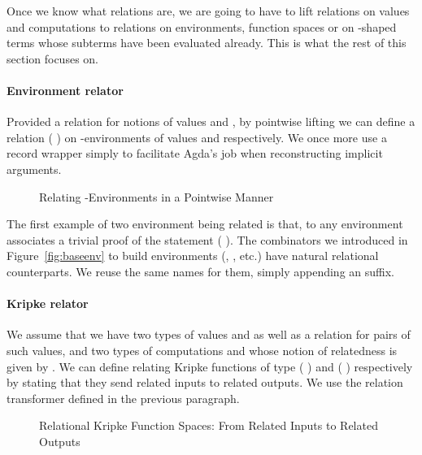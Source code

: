 Once we know what relations are, we are going to have to lift relations on values
and computations to relations on environments,  function spaces or
on -shaped terms whose subterms have been evaluated already.
This is what the rest of this section focuses on.

\paragraph{Environment relator}
Provided a relation  for notions of values  and , by
pointwise lifting we can define a relation {(  )} on
-environments of values  and  respectively. We once more
use a record wrapper simply to facilitate Agda's job when reconstructing
implicit arguments.

\begin{figure}[h]
\caption{Relating -Environments in a Pointwise Manner\label{defn:Env-rel}}
\end{figure}

The first example of two environment being related is  that, to any
environment  associates a trivial proof of the statement
{(    )}.
The combinators we introduced in Figure~\ref{fig:baseenv} to build environments
(, , etc.) have natural relational counterparts. We reuse the same
names for them, simply appending an  suffix.

\paragraph{Kripke relator}
We assume that we have two types of values  and 
as well as a relation  for pairs of such values, and two types of computations
 and  whose notion of relatedness is given by . We can define
 relating Kripke functions of type
{(  )} and {(  )}
respectively by stating that they send related inputs
to related outputs. We use the relation transformer  defined in the previous
paragraph.

\begin{figure}[h]
\caption{Relational Kripke Function Spaces: From Related Inputs to Related Outputs\label{fig:Kripke-rel}}
\end{figure}

